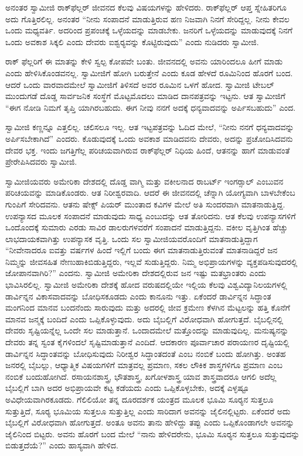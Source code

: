 \vskip 3pt

 ಅನಂತರ ಸ್ವಾಮೀಜಿ ರಾಕ್‍ಫೆಲ್ಲರ್ ಜೀವನದ ಕೆಲವು ವಿಷಯಗಳನ್ನು ಹೇಳಿದರು. ರಾಕ್‍ಫೆಲ್ಲರ್ ಆಪ್ತ ಸ್ನೇಹಿತರಿಗೂ ಅದು ಗೊತ್ತಿರಲಿಲ್ಲ. ಅನಂತರ “ನೀನು ಸಂಪಾದನೆ ಮಾಡುತ್ತಿರುವ ಹಣ ನಿಜವಾಗಿ ನಿನಗೆ ಸೇರಿದ್ದಲ್ಲ. ನೀನು ಕೇವಲ ಒಂದು ಮಧ್ಯವರ್ತಿ. ಅದರಿಂದ ಪ್ರಪಂಚಕ್ಕೆ ಒಳ್ಳೆಯದನ್ನು ಮಾಡಬೇಕು. ಜನರಿಗೆ ಒಳ್ಳೆಯದನ್ನು ಮಾಡುವುದಕ್ಕೆ ನಿನಗೆ ಒಂದು ಅವಕಾಶ ಸಿಕ್ಕಲಿ ಎಂದು ದೇವರು ಐಶ್ವರ‍್ಯವನ್ನು ಕೊಟ್ಟಿರುವುದು” ಎಂದು ನುಡಿದರು ಸ್ವಾಮೀಜಿ. 

\vskip 3pt

 ರಾಕ್ ಫೆಲ್ಲರಿಗೆ ಈ ಮಾತನ್ನು ಕೇಳಿ ಸ್ವಲ್ಪ ಕೋಪವೇ ಬಂತು. ಜೀವನದಲ್ಲಿ ಅವನು ಯಾರಿಂದಲೂ ಹೀಗೆ ಮಾಡು ಎಂದು ಹೇಳಿಸಿಕೊಂಡವನಲ್ಲ. ಸ್ವಾಮೀಜಿಗೆ ಹೋಗಿ ಬರುತ್ತೇನೆ ಎಂದು ಕೂಡ ಹೇಳದೆ ರೂಮಿನಿಂದ ಹೊರಗೆ ಬಂದ. ಆದರೆ ಒಂದು ವಾರವಾದಮೇಲೆ ಸ್ವಾಮೀಜಿಗೆ ತಿಳಿಸದೆ ಅವರ ರೂಮಿನ ಒಳಗೆ ಹೋದ. ಸ್ವಾಮೀಜಿ ಟೇಬಲ್ ಮುಂದುಗಡೆ ದೊಡ್ಡ ಸಾರ್ವಜನಿಕ ಸಂಸ್ಥೆಗೆ ಮೊಟ್ಟಮೊದಲು ಮಾಡಿದ ದಾನಪತ್ರವನ್ನು ಇಟ್ಟನು. ಆತ ಸ್ವಾಮೀಜಿಗೆ “ಈಗ ನೋಡಿ ನಿಮಗೆ ತೃಪ್ತಿ ಯಾಗಿರಬಹುದು. ಈಗ ನೀವು ನನಗೆ ಅದಕ್ಕೆ ಧನ್ಯವಾದವನ್ನು ಅರ್ಪಿಸಬಹುದು” ಎಂದ. 

 ಸ್ವಾಮೀಜಿ ಕಣ್ಣನ್ನೂ ಎತ್ತಲಿಲ್ಲ. ಚಲಿಸಲೂ ಇಲ್ಲ. ಆತ ಇಟ್ಟಪತ್ರವನ್ನು ಓದಿದ ಮೇಲೆ, “ನೀನು ನನಗೆ ಧನ್ಯವಾದವನ್ನು ಅರ್ಪಿಸಬೇಕಾಗಿದೆ” ಎಂದರು. ಕೊಡುವುದಕ್ಕೆ ಒಂದು ಅವಕಾಶ ಮಾಡಿದವನು ದೇವರು, ಅದನ್ನು ಪ್ರಚೋದಿಸಿದವನು ದೇವರ ಭಕ್ತ. ಇಂದು ಜಗತ್ತಿಗೆಲ್ಲ ಪರಿಚಯವಾಗಿರುವ ರಾಕ್‍ಫೆಲ್ಲರ್ ನಿಧಿಯ ಹಿಂದೆ, ಆತನನ್ನು ಹಾಗೆ ಮಾಡುವಂತೆ ಪ್ರೇರೇಪಿಸಿದವರು ಸ್ವಾಮೀಜಿ. 

 ಸ್ವಾಮೀಜಿಯವರು ಅಮೇರಿಕಾ ದೇಶದಲ್ಲಿ ದೊಡ್ಡ ವಾಗ್ಮಿ ಮತ್ತು ವಕೀಲನಾದ ರಾಬರ್ಟ್ ಇಂಗರ್‍ಸಾಲ್ ಎಂಬುವನ ಪರಿಚಯವನ್ನು ಮಾಡಿಕೊಂಡರು. ಆತ ನಿರೀಶ್ವರವಾದಿ. ಆದರೆ ಈ ಜೀವನದಲ್ಲಿ ಚೆನ್ನಾಗಿ ಯೋಗ್ಯವಾಗಿ ಬಾಳಬೇಕೆಂಬ ಗುಂಪಿಗೆ ಸೇರಿದವನು. ಆತನು ಷೇಕ್ಸ್ ಪಿಯರ್ ಮುಂತಾದ ಕವಿಗಳ ಮೇಲೆ ಅತಿ ಸುಂದರವಾಗಿ ಮಾತನಾಡುತ್ತಿದ್ದ. ಉಪನ್ಯಾಸದ ಮೂಲಕ ಸಂಪಾದನೆ ಮಾಡುವುದು ಸಾಧ್ಯ ಎಂಬುದನ್ನು ಆತ ತೋರಿದನು. ಆತ ಕೆಲವು ಉಪನ್ಯಾಸಗಳಿಗೆ ಒಂದೊಂದಕ್ಕೆ ಸುಮಾರು ಎರಡು ಸಾವಿರ ಡಾಲರುಗಳವರೆಗೆ ಸಂಪಾದನೆ ಮಾಡುತ್ತಿದ್ದನು. ವಕೀಲ ವೃತ್ತಿಗಿಂತ ಹೆಚ್ಚು ಲಾಭದಾಯಕವಾಗಿತ್ತು ಉಪನ್ಯಾಸಕ ವೃತ್ತಿ. ಒಂದು ಸಲ ಸ್ವಾಮೀಜಿಯವರೊಂದಿಗೆ ಮಾತನಾಡುತ್ತಿದ್ದಾಗ “ನೀವೇನಾದರೂ ಐವತ್ತು ವರ್ಷಗಳ ಹಿಂದೆ ಇಲ್ಲಿಗೆ ಬಂದು ಈಗ ಮಾತನಾಡುತ್ತಿರುವಂತೆ ಮಾತನಾಡಿದ್ದರೆ ಜನ ನಿಮ್ಮನ್ನು ಜೀವಸಹಿತ ನೇಣುಹಾಕಿಬಿಡುತ್ತಿದ್ದರು, ಇಲ್ಲವೆ ಸುಡುತ್ತಿದ್ದರು. ನಿಮ್ಮ ಅಭಿಪ್ರಾಯಗಳನ್ನು ವ್ಯಕ್ತಪಡಿಸುವುದರಲ್ಲಿ ಜೋಪಾನವಾಗಿರಿ?” ಎಂದನು. ಸ್ವಾಮೀಜಿ ಅಮೇರಿಕಾ ದೇಶದಲ್ಲಿರುವ ಜನ ಇಷ್ಟು ಮತಭ್ರಾಂತರು ಎಂದು ಭಾವಿಸಿರಲಿಲ್ಲ. ಸ್ವಾಮೀಜಿ ಅಮೇರಿಕಾ ದೇಶಕ್ಕೆ ಹೋದ ವರುಷದಲ್ಲಿಯೇ ಇಲ್ಲಿಯ ಕೆಲವು ವಿಶ್ವವಿದ್ಯಾನಿಲಯಗಳಲ್ಲಿ ಡಾರ್ವಿನ್ನನ ವಿಕಾಸವಾದವನ್ನು ಬೋಧಿಸಕೂಡದು ಎಂದು ಕಾನೂನು ಇತ್ತು. ಏಕೆಂದರೆ ಡಾರ್ವಿನ್ನನ ಸಿದ್ಧಾಂತ ಮಂಗನಿಂದ ಮಾನವ ಬಂದನೆಂದು ಸಾರುವುದು ಮತ್ತು ಅದರಲ್ಲಿ ಜೀವ ಕ್ರಮೇಣ ಕೆಳಗಿನ ಮೆಟ್ಟಲನ್ನು ಹತ್ತಿ ಕೊನೆಗೆ ಮಾನವ ಜನ್ಮಕ್ಕೆ ಬಂದಿದೆ ಎಂದು ಒಪ್ಪಿಕೊಳ್ಳುವುದು. ಅದು ಬೈಬಲ್ಲಿಗೆ ವಿರೋಧವಾಗಿ ಹೋಗುತ್ತದೆ. ಬೈಬಲ್ಲಿನಲ್ಲಿ ದೇವರು ಸೃಷ್ಟಿಯನ್ನೆಲ್ಲ ಒಂದೇ ಸಲ ಮಾಡುತ್ತಾನೆ. ಒಂದಾದಮೇಲೆ ಮತ್ತೊಂದನ್ನು ಮಾಡುವುದಿಲ್ಲ. ಮನುಷ್ಯನನ್ನು ದೇವರು ತನ್ನ ಸ್ವಂತ ಕೈಗಳಿಂದಲೆ ಸೃಷ್ಟಿಮಾಡುತ್ತಾನೆ ಎಂದಿದೆ. ಆದಕಾರಣ ಪೂರ್ವಾಚಾರ ಪರಾಯಣರ ದೃಷ್ಟಿಯಲ್ಲಿ ಡಾರ್ವಿನ್ನನ ಸಿದ್ಧಾಂತವನ್ನು ಬೋಧಿಸುವುದು ನಿರೀಶ್ವರ ಸಿದ್ಧಾಂತದಂತೆ ಎಂಬ ನಂಬಿಕೆ ಬಂದು ಹೋಗಿತ್ತು. ಅಂತಹ ಜನರಲ್ಲಿ ಬೈಬಲ್ಲು, ಆಧ್ಯಾತ್ಮಿಕ ವಿಷಯಗಳಿಗೆ ಮಾತ್ರವಲ್ಲ ಪ್ರಮಾಣ, ಸಕಲ ಲೌಕಿಕ ಶಾಸ್ತ್ರಗಳಿಗೂ ಪ್ರಮಾಣ ಎಂಬ ನಂಬಿಕೆ ಬಂದುಹೋಗಿದೆ. ರಸಾಯನಶಾಸ್ತ್ರ, ಭೌತಶಾಸ್ತ್ರ, ಖಗೋಳಶಾಸ್ತ್ರ ಯಾವ ಶಾಸ್ತ್ರವಾದರೂ ಆಗಲಿ ಅದೆಲ್ಲ ಬೈಬಲ್ಲಿಗೆ ಬಾಗಿ ಅದರ ಅಭಿಪ್ರಾಯವೇ ಕಟ್ಟ ಕಡೆಯದು ಎಂದು ಒಪ್ಪಿಕೊಳ್ಳಬೇಕು, ಅದಕ್ಕೆ ಎಳ್ಳಷ್ಟೂ ಅವಿಧೇಯವಾಗಿರಕೂಡದು. ಗೆಲಿಲಿಯೋ ತನ್ನ ದೂರದರ್ಶಕ ಯಂತ್ರದ ಮೂಲಕ ಭೂಮಿ ಸೂರ‍್ಯನ ಸುತ್ತಲೂ ಸುತ್ತುತ್ತಿದೆ, ಸೂರ‍್ಯ ಭೂಮಿಯ ಸುತ್ತಲೂ ಸುತ್ತುತ್ತಿಲ್ಲ ಎಂದು ಸಾರಿದಾಗ ಅವನನ್ನು ಜೈಲಿನಲ್ಲಿಟ್ಟರು. ಏಕೆಂದರೆ ಅದು ಬೈಬಲ್ಲಿಗೆ ವಿರೋಧವಾಗಿ ಹೋಗುತ್ತದೆ. ಅಂತೂ ಅವನು ತಾನು ಹೇಳಿದ್ದು ತಪ್ಪು ಎಂದು ಒಪ್ಪಿಕೊಂಡಾಗಲೇ ಅವನನ್ನು ಜೈಲಿನಿಂದ ಬಿಟ್ಟರು. ಅವನು ಹೊರಗೆ ಬಂದ ಮೇಲೆ “ನಾನು ಹೇಳಿದರೇನು, ಭೂಮಿ ಸೂರ‍್ಯನ ಸುತ್ತಲೂ ಸುತ್ತುವುದನ್ನು ಬಿಡುತ್ತದೆಯೆ?” ಎಂದು ಹಾಸ್ಯವಾಗಿ ಹೇಳಿದ. 

